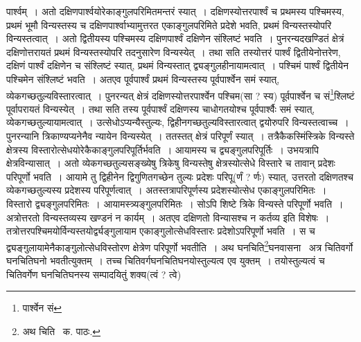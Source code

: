 \documentclass[11pt, openany]{book}
\begin{document}
\noindent पार्श्वम्~। अतो दक्षिणपार्श्वयोरेकाङ्गुलपरिमितमन्तरं स्यात्~। दक्षिणस्योत्तरपार्श्वं च प्रथमस्य पश्चिमस्य, प्रथमं भूमौ विन्यस्तस्य च
दक्षिणपार्श्वाभ्यामुत्तरत एकाङ्गुलपरिमिते प्रदेशे भवति, प्रथमं विन्यस्तस्योपरि विन्यस्तत्वात्~। अतो द्वितीयस्य पश्चिमस्य दक्षिणपार्श्वं दक्षिणेन संश्लिष्टं भवति~। पुनरन्यदखण्डितं क्षेत्रं दक्षिणोत्तरायतं प्रथमं विन्यस्तस्योपरि तदनुसारेण विन्यस्येत्~। तथा सति तस्योत्तरं पार्श्वं द्वितीयेनोत्तरेण, दक्षिणं पार्श्वं दक्षिणेन च संश्लिष्टं स्यात्, प्रथमं विन्यस्तात् द्व्यङ्गुलहीनायामत्वात्~। पश्चिमं पार्श्वं द्वितीयेन पश्चिमेन संश्लिष्टं भवति~। अतएव पूर्वपार्श्वं प्रथमं
विन्यस्तस्य पूर्वपार्श्वेन समं स्यात्, व्येकगच्छतुल्यविस्तारत्वात्~। पुनरन्यत् क्षेत्रं दक्षिणस्योत्तरपार्श्वेन पश्चिम(सा ? स्य) पूर्वपार्श्वेन च सं\renewcommand{\thefootnote}{१}\footnote{पार्श्वेन सं}श्लिष्टं पूर्वापरायतं विन्यस्येत्~। तथा सति तस्य पूर्वपार्श्वं दक्षिणस्य चाधोगतयोश्च पूर्वपार्श्वैः समं स्यात्, व्येकगच्छतुल्यायामत्वात्~। उत्सेधोऽप्यन्यैस्तुल्यः,
द्विहीनगच्छतुल्यविस्तारत्वात् द्वयोरुपरि विन्यस्तत्वाच्च~। पुनरन्यानि त्रिकाण्यप्यनेनैव न्यायेन विन्यस्येत्~। ततस्तत् क्षेत्रं परिपूर्णं स्यात्~। तत्रैकैकस्मिंस्त्रिके विन्यस्ते क्षेत्रस्य विस्तारोत्सेधयोरेकैकाङ्गुलपरिपूर्तिर्भवति~। आयामस्य च द्व्यङ्गुलपरिपूर्तिः~। उभयत्रापि क्षेत्रविन्यासात्~। अतो
व्येकगच्छतुल्यसङ्ख्येषु त्रिकेषु विन्यस्तेषु क्षेत्रस्योत्सेधे विस्तारे च तावान् प्रदेशः परिपूर्णो भवति~। आयामे तु द्विहीनेन द्विगुणितगच्छेन तुल्यः प्रदेशः परिपू(र्णं ? र्णः) स्यात्, उत्तरतो दक्षिणतश्च व्येकगच्छतुल्यस्य प्रदेशस्य परिपूर्णत्वात्~। अतस्तत्रापरिपूर्णस्य प्रदेशस्योत्सेध एकाङ्गुलपरिमितः~। विस्तारो द्व्यङ्गुलपरिमितः~। आयामस्त्र्यङ्गुलपरिमितः~। सोऽपि शिष्टे त्रिके विन्यस्ते परिपूर्णो भवति~। अत्रोत्तरतो विन्यस्तव्यस्य
खण्डनं न कार्यम्~। अतएव दक्षिणतो विन्यासश्च न कर्तव्य इति विशेषः~। तत्रोत्तरपश्चिमयोर्विन्यस्तयोर्द्व्यङ्गुलायाम एकाङ्गुलोत्सेधविस्तारः
प्रदेशोऽपरिपूर्णो भवति~। स च द्व्यङ्गुलायामेनैकाङ्गुलोत्सेधविस्तोरण क्षेत्रेण परिपूर्णो भवतीति~। अथ घनचिति\renewcommand{\thefootnote}{२}\footnote{अथ चिति \textendash\ क. पाठः.}घनवासना \textendash\ अत्र चितिवर्गो घनचितिघनो भवतीत्युक्तम्~। तच्च चितिवर्गघनचितिघनयोस्तुल्यत्व एव युक्तम्~। तयोस्तुल्यत्वं च चितिवर्गेण घनचितिघनस्य सम्पादयितुं शक्य(त्वं ? त्वे)

\newpage
\end{document}
